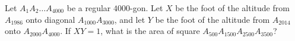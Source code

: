 Let $A_1A_2 \dots A_{4000}$ be a regular $4000$-gon. Let $X$ be the foot of the altitude from $A_{1986}$ onto diagonal $A_{1000}A_{3000}$, and let $Y$ be the foot of the altitude from $A_{2014}$ onto $A_{2000}A_{4000}$. If $XY = 1$, what is the area of square $A_{500}A_{1500}A_{2500}A_{3500}$?
